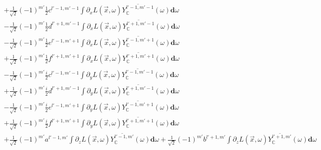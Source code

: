 \documentclass[10pt]{scrartcl}
\begin{document}
\begin{align*}
\\&
+\frac{1}{\sqrt{2}}\left({-1}\right)^{m'}\frac{1}{2}c^{{l'-1,m'-1}}\int{\partial_xL\left (\vec{x} ,\omega \right )\overline{Y_{\mathbb{C}}^{l'-1, m'-1}}(\omega )\mathbf{d}\omega}
\\&
-\frac{1}{\sqrt{2}}\left({-1}\right)^{m'}\frac{1}{2}d^{{l'+1,m'-1}}\int{\partial_xL\left (\vec{x} ,\omega \right )\overline{Y_{\mathbb{C}}^{l'+1, m'-1}}(\omega )\mathbf{d}\omega}
\\&
-\frac{1}{\sqrt{2}}\left({-1}\right)^{m'}\frac{1}{2}e^{{l'-1,m'+1}}\int{\partial_xL\left (\vec{x} ,\omega \right )\overline{Y_{\mathbb{C}}^{l'-1, m'+1}}(\omega )\mathbf{d}\omega}
\\&
+\frac{1}{\sqrt{2}}\left({-1}\right)^{m'}\frac{1}{2}f^{{l'+1,m'+1}}\int{\partial_xL\left (\vec{x} ,\omega \right )\overline{Y_{\mathbb{C}}^{l'+1, m'+1}}(\omega )\mathbf{d}\omega}
\\&
-\frac{1}{\sqrt{2}}\left({-1}\right)^{m'}\frac{i}{2}c^{{l'-1,m'-1}}\int{\partial_yL\left (\vec{x} ,\omega \right )\overline{Y_{\mathbb{C}}^{l'-1, m'-1}}(\omega )\mathbf{d}\omega}
\\&
+\frac{1}{\sqrt{2}}\left({-1}\right)^{m'}\frac{i}{2}d^{{l'+1,m'-1}}\int{\partial_yL\left (\vec{x} ,\omega \right )\overline{Y_{\mathbb{C}}^{l'+1, m'-1}}(\omega )\mathbf{d}\omega}
\\&
-\frac{1}{\sqrt{2}}\left({-1}\right)^{m'}\frac{i}{2}e^{{l'-1,m'+1}}\int{\partial_yL\left (\vec{x} ,\omega \right )\overline{Y_{\mathbb{C}}^{l'-1, m'+1}}(\omega )\mathbf{d}\omega}
\\&
+\frac{1}{\sqrt{2}}\left({-1}\right)^{m'}\frac{i}{2}f^{{l'+1,m'+1}}\int{\partial_yL\left (\vec{x} ,\omega \right )\overline{Y_{\mathbb{C}}^{l'+1, m'+1}}(\omega )\mathbf{d}\omega}
\\&
+\frac{1}{\sqrt{2}}\left({-1}\right)^{m'}a^{{l'-1,m'}}\int{\partial_zL\left (\vec{x} ,\omega \right )\overline{Y_{\mathbb{C}}^{l'-1, m'}}(\omega )\mathbf{d}\omega}
+\frac{1}{\sqrt{2}}\left({-1}\right)^{m'}b^{{l'+1,m'}}\int{\partial_zL\left (\vec{x} ,\omega \right )\overline{Y_{\mathbb{C}}^{l'+1, m'}}(\omega )\mathbf{d}\omega}
\end{align*}
\end{document}
